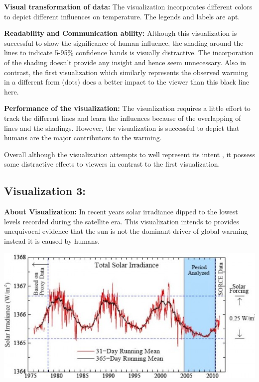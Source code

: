 \documentclass[]{book}
\begin{document}
\textbf{Visual transformation of data:} The visualization incorporates different colors to depict different influences on temperature. The legends and labels are apt.

\textbf{Readability and Communication ability:} Although this visualization is successful to show the significance of human influence, the shading around the lines to indicate 5-95\% confidence bands is visually distractive. The incorporation of the shading doesn't provide any insight and hence seem unnecessary. Also in contrast, the first visualization which similarly represents the observed warming in a different form (dots) does a better impact to the viewer than this black line here.

\textbf{Performance of the visualization:} The visualization requires a little effort to track the different lines and learn the influences because of the overlapping of lines and the shadings. However, the visualization is successful to depict that humans are the major contributors to the warming.

Overall although the visualization attempts to well represent its intent , it possess some distractive effects to viewers in contrast to the first visualization.

\hypertarget{visualization-3}{%
\subsection{Visualization 3:}\label{visualization-3}}

\textbf{About Visualization:} In recent years solar irradiance dipped to the lowest levels recorded during the satellite era. This visualization intends to provides unequivocal evidence that the sun is not the dominant driver of global warming instead it is caused by humans.

\includegraphics{_images/Vz4-Solar.png}
\end{document}
